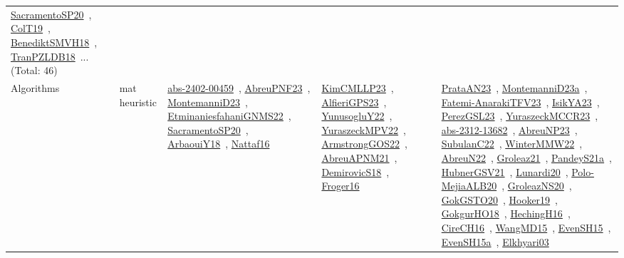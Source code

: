 {\begin{longtable}{lp{3cm}>{\raggedright\arraybackslash}p{6cm}>{\raggedright\arraybackslash}p{6cm}>{\raggedright\arraybackslash}p{8cm}}
\href{../works/SacramentoSP20.pdf}{SacramentoSP20}~\cite{SacramentoSP20}, \href{../works/ColT19.pdf}{ColT19}~\cite{ColT19}, \href{../works/BenediktSMVH18.pdf}{BenediktSMVH18}~\cite{BenediktSMVH18}, \href{../works/TranPZLDB18.pdf}{TranPZLDB18}~\cite{TranPZLDB18}... (Total: 46)\\
Algorithms & mat heuristic & \href{../works/abs-2402-00459.pdf}{abs-2402-00459}~\cite{abs-2402-00459}, \href{../works/AbreuPNF23.pdf}{AbreuPNF23}~\cite{AbreuPNF23}, \href{../works/MontemanniD23.pdf}{MontemanniD23}~\cite{MontemanniD23}, \href{../works/EtminaniesfahaniGNMS22.pdf}{EtminaniesfahaniGNMS22}~\cite{EtminaniesfahaniGNMS22}, \href{../works/SacramentoSP20.pdf}{SacramentoSP20}~\cite{SacramentoSP20}, \href{../works/ArbaouiY18.pdf}{ArbaouiY18}~\cite{ArbaouiY18}, \href{../works/Nattaf16.pdf}{Nattaf16}~\cite{Nattaf16} & \href{../works/KimCMLLP23.pdf}{KimCMLLP23}~\cite{KimCMLLP23}, \href{../works/AlfieriGPS23.pdf}{AlfieriGPS23}~\cite{AlfieriGPS23}, \href{../works/YunusogluY22.pdf}{YunusogluY22}~\cite{YunusogluY22}, \href{../works/YuraszeckMPV22.pdf}{YuraszeckMPV22}~\cite{YuraszeckMPV22}, \href{../works/ArmstrongGOS22.pdf}{ArmstrongGOS22}~\cite{ArmstrongGOS22}, \href{../works/AbreuAPNM21.pdf}{AbreuAPNM21}~\cite{AbreuAPNM21}, \href{../works/DemirovicS18.pdf}{DemirovicS18}~\cite{DemirovicS18}, \href{../works/Froger16.pdf}{Froger16}~\cite{Froger16} & \href{../works/PrataAN23.pdf}{PrataAN23}~\cite{PrataAN23}, \href{../works/MontemanniD23a.pdf}{MontemanniD23a}~\cite{MontemanniD23a}, \href{../works/Fatemi-AnarakiTFV23.pdf}{Fatemi-AnarakiTFV23}~\cite{Fatemi-AnarakiTFV23}, \href{../works/IsikYA23.pdf}{IsikYA23}~\cite{IsikYA23}, \href{../works/PerezGSL23.pdf}{PerezGSL23}~\cite{PerezGSL23}, \href{../works/YuraszeckMCCR23.pdf}{YuraszeckMCCR23}~\cite{YuraszeckMCCR23}, \href{../works/abs-2312-13682.pdf}{abs-2312-13682}~\cite{abs-2312-13682}, \href{../works/AbreuNP23.pdf}{AbreuNP23}~\cite{AbreuNP23}, \href{../works/SubulanC22.pdf}{SubulanC22}~\cite{SubulanC22}, \href{../works/WinterMMW22.pdf}{WinterMMW22}~\cite{WinterMMW22}, \href{../works/AbreuN22.pdf}{AbreuN22}~\cite{AbreuN22}, \href{../works/Groleaz21.pdf}{Groleaz21}~\cite{Groleaz21}, \href{../works/PandeyS21a.pdf}{PandeyS21a}~\cite{PandeyS21a}, \href{../works/HubnerGSV21.pdf}{HubnerGSV21}~\cite{HubnerGSV21}, \href{../works/Lunardi20.pdf}{Lunardi20}~\cite{Lunardi20}, \href{../works/Polo-MejiaALB20.pdf}{Polo-MejiaALB20}~\cite{Polo-MejiaALB20}, \href{../works/GroleazNS20.pdf}{GroleazNS20}~\cite{GroleazNS20}, \href{../works/GokGSTO20.pdf}{GokGSTO20}~\cite{GokGSTO20}, \href{../works/Hooker19.pdf}{Hooker19}~\cite{Hooker19}, \href{../works/GokgurHO18.pdf}{GokgurHO18}~\cite{GokgurHO18}, \href{../works/HechingH16.pdf}{HechingH16}~\cite{HechingH16}, \href{../works/CireCH16.pdf}{CireCH16}~\cite{CireCH16}, \href{../works/WangMD15.pdf}{WangMD15}~\cite{WangMD15}, \href{../works/EvenSH15.pdf}{EvenSH15}~\cite{EvenSH15}, \href{../works/EvenSH15a.pdf}{EvenSH15a}~\cite{EvenSH15a}, \href{../works/Elkhyari03.pdf}{Elkhyari03}~\cite{Elkhyari03}\\

\end{longtable}}
